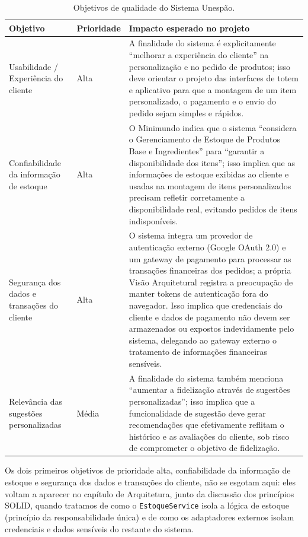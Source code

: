 \documentclass[a4paper,12pt,oneside,openany]{book}
\begin{document}
\begin{table}[H]
\centering
\caption{Objetivos de qualidade do Sistema Unespão.}
\begin{tabularx}{0.95\textwidth}{p{} p{} X}
\toprule
\textbf{Objetivo} & \textbf{Prioridade} & \textbf{Impacto esperado no projeto} \\
\midrule
Usabilidade / Experiência do cliente & Alta & A finalidade do sistema é explicitamente ``melhorar a experiência do cliente'' na personalização e no pedido de produtos; isso deve orientar o projeto das interfaces de totem e aplicativo para que a montagem de um item personalizado, o pagamento e o envio do pedido sejam simples e rápidos. \\
Confiabilidade da informação de estoque & Alta & O Minimundo indica que o sistema ``considera o Gerenciamento de Estoque de Produtos Base e Ingredientes'' para ``garantir a disponibilidade dos itens''; isso implica que as informações de estoque exibidas ao cliente e usadas na montagem de itens personalizados precisam refletir corretamente a disponibilidade real, evitando pedidos de itens indisponíveis. \\
Segurança dos dados e transações do cliente & Alta & O sistema integra um provedor de autenticação externo (Google OAuth 2.0) e um gateway de pagamento para processar as transações financeiras dos pedidos; a própria Visão Arquitetural registra a preocupação de manter tokens de autenticação fora do navegador. Isso implica que credenciais do cliente e dados de pagamento não devem ser armazenados ou expostos indevidamente pelo sistema, delegando ao gateway externo o tratamento de informações financeiras sensíveis. \\
Relevância das sugestões personalizadas & Média & A finalidade do sistema também menciona ``aumentar a fidelização através de sugestões personalizadas''; isso implica que a funcionalidade de sugestão deve gerar recomendações que efetivamente reflitam o histórico e as avaliações do cliente, sob risco de comprometer o objetivo de fidelização. \\
\bottomrule
\end{tabularx}
\end{table}

Os dois primeiros objetivos de prioridade alta, confiabilidade da informação de estoque e segurança dos dados e transações do cliente, não se esgotam aqui: eles voltam a aparecer no capítulo de Arquitetura, junto da discussão dos princípios SOLID, quando tratamos de como o \texttt{EstoqueService} isola a lógica de estoque (princípio da responsabilidade única) e de como os adaptadores externos isolam credenciais e dados sensíveis do restante do sistema.
\end{document}
